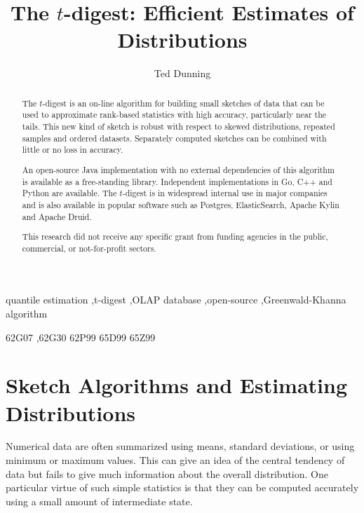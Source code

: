 \documentclass[preprint,12pt, a4paper]{elsarticle}
\begin{document}
\begin{frontmatter}


 \title{The $t$-digest: Efficient Estimates of Distributions}


\author{Ted Dunning}
\address{Hewlett Packard Enterprise, Los Altos, California}

\begin{abstract}
The $t$-digest is an on-line algorithm for building small sketches of data that can be used to approximate rank-based statistics with high accuracy, particularly near the tails.  This new kind of sketch is robust with respect to skewed distributions, repeated samples and ordered datasets. Separately computed sketches can be combined with little or no loss in accuracy.

An open-source Java implementation with no external dependencies of this algorithm is available as a free-standing library. Independent implementations in Go, C++ and Python are available. The $t$-digest is in widespread internal use in major companies and is also available in popular software such as Postgres, ElasticSearch, Apache Kylin and Apache Druid.

This research did not receive any specific grant from funding agencies in the public, commercial, or not-for-profit sectors.
\end{abstract}

\begin{keyword}
quantile estimation \sep t-digest \sep OLAP database \sep open-source \sep Greenwald-Khanna algorithm

\MSC[2020] 62G07 \sep 62G30 62P99 65D99 65Z99 
\end{keyword}

\end{frontmatter}

\section{Sketch Algorithms and Estimating Distributions}
Numerical data are often summarized using means, standard deviations, or using minimum or maximum values. This can give an idea of the central tendency of data but fails to give much information about the overall distribution. One particular virtue of such simple statistics is that they can be computed accurately  using a small amount of intermediate state.
\end{document}
